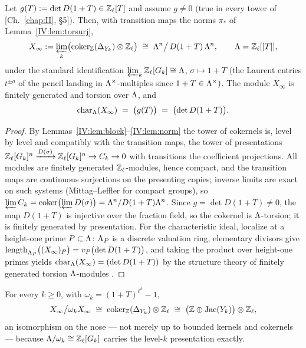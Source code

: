 \begin{theorem}\label{IV:thm:limit}
Let $g(T):=\det D(1+T)\in\mathbb{Z}_\ell[T]$ and assume $g\neq0$ $($true in every tower of
{\rm[Ch.~\ref{chap:II}, \S5]}$)$. Then, with transition maps the norms $\pi_*$ of
Lemma~\ref{IV:lem:torsurj},
\[
X_\infty:=\varprojlim_k\bigl(\operatorname{coker}_{\mathbb{Z}}(\Delta_{Y_k})\otimes\mathbb{Z}_\ell\bigr)
\;\cong\;\Lambda^n\big/\,D(1+T)\,\Lambda^n ,
\qquad \Lambda=\mathbb{Z}_\ell[[T]],
\]
under the standard identification $\varprojlim_k\mathbb{Z}_\ell[G_k]\cong\Lambda$,
$\sigma\mapsto1+T$ $($the Laurent entries $t^{\pm a}$ of the pencil landing in
$\Lambda^\times$-multiples since $1+T\in\Lambda^\times)$. The module $X_\infty$ is finitely
generated and torsion over $\Lambda$, and
\[
\operatorname{char}_{\Lambda}(X_\infty)\;=\;\bigl(g(T)\bigr)\;=\;\bigl(\det D(1+T)\bigr).
\]
\end{theorem}

\begin{proof}
By Lemmas~\ref{IV:lem:block}--\ref{IV:lem:norm} the tower of cokernels is, level by level
and compatibly with the transition maps, the tower of presentations
$\mathbb{Z}_\ell[G_k]^n\xrightarrow{D(\sigma)}\mathbb{Z}_\ell[G_k]^n\to C_k\to0$ with transitions the
coefficient projections. All modules are finitely generated $\mathbb{Z}_\ell$-modules, hence
compact, and the transition maps are continuous surjections on the presenting
copies; inverse limits are exact on such systems (Mittag--Leffler for compact
groups), so $\varprojlim C_k=\operatorname{coker}\bigl(\varprojlim D(\sigma)\bigr)
=\Lambda^n/D(1+T)\Lambda^n$. Since $g=\det D(1+T)\neq0$, the map $D(1+T)$ is injective over
the fraction field, so the cokernel is $\Lambda$-torsion; it is finitely generated by
presentation. For the characteristic ideal, localize at a height-one prime
$P\subset\Lambda$: $\Lambda_P$ is a discrete valuation ring, elementary divisors give
$\operatorname{length}_{\Lambda_P}\bigl((X_\infty)_P\bigr)=v_P\bigl(\det D(1+T)\bigr)$,
and taking the product over height-one primes yields
$\operatorname{char}_{\Lambda}(X_\infty)=(\det D(1+T))$ by the structure theory of finitely generated
torsion $\Lambda$-modules \cite{Washington}.
\end{proof}

\begin{corollary}\label{IV:cor:control}
For every $k\ge0$, with $\omega_k=(1+T)^{\ell^k}-1$,
\[
X_\infty\big/\omega_k X_\infty\;\cong\;\operatorname{coker}_{\mathbb{Z}}(\Delta_{Y_k})\otimes\mathbb{Z}_\ell
\;\cong\;\bigl(\mathbb{Z}\oplus\operatorname{Jac}(Y_k)\bigr)\otimes\mathbb{Z}_\ell ,
\]
an isomorphism on the nose --- not merely up to bounded kernels and cokernels ---
because $\Lambda/\omega_k\cong\mathbb{Z}_\ell[G_k]$ carries the level-$k$ presentation exactly.
\end{corollary}

